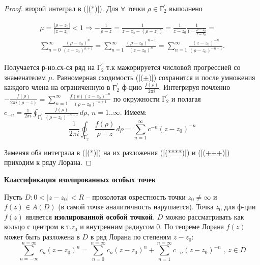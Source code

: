 \begin{proof}
\bigbreak
{} второй интеграл в (\ref{(*)}). Для $\forall$ точки $\rho \in  \text{Г}_2^{'}$ выполнено 

\begin{equation}
\begin{gathered}
    \mu=\frac{|\rho-z_0|}{|z-z_0|}<1 \Rightarrow -\frac{1}{\rho-z} = \frac{1}{z-z_0-(\rho-z_0)} = \frac{1}{z-z_0}\frac{1}{1-\frac{\rho-z_0}{z-z_0}}=
        \\
    \sum_{n=0}^{\infty}\frac{(\rho-z_0)^n}{(z-z_0)^{n+1}}=\sum_{n=1}^{\infty}\frac{(\rho-z_0)^{n-1}}{(z-z_0)^{n}}=
    \sum_{n=1}^{\infty}\frac{(z-z_0)^{-n} }{(\rho-z_0)^{-n+1}}.
\end{gathered}
    \label{(+)}
\end{equation}

Получается р-но.сх-ся ряд на $\text{Г}_2^{'}$ т.к мажорируется числовой прогрессией со знаменателем $\mu$. Равномерная сходимость (\ref{(+)}) сохранится и после умножения каждого члена на ограниченную в $\text{Г}_2^{'}$ ф-цию $\frac{f(\rho)}{2\pi i}$. Интегрируя почленно $-\frac{f(\rho)}{2\pi i(\rho-z)}=\sum_{n=1}^{\infty}\frac{f(\rho)(z-z_0)^{-n} }{(\rho-z_0)^{-n+1}}$ по окружности $\text{Г}_2^{'}$ и полагая $c_{-n} = \frac{1}{2\pi i} \oint_{ \text{Г}_1^{'}} \frac{f(\rho)}{(\rho-z_0)^{-n+1}} \,d\rho \text{, }n=1..\infty$. Имеем: 
\begin{equation}
    \frac{1}{2\pi i} \oint_{ \text{Г}_2^{'}} \frac{f(\rho)}{\rho-z} \,d\rho = \sum_{n=1}^{\infty} c^{-n}(z-z_0)^{-n}
    \label{(+++)}
\end{equation}


Заменяя оба интеграла в (\ref{(*)}) на их разложения (\ref{(****)}) и (\ref{(+++)}) приходим к ряду Лорана.
\end{proof}

\textbf{Классификация изолированных особых точек}

Пусть $D:0<|z-z_0|<R$ -- проколотая окрестность точки $z_0\neq\infty$ и $f(z) \in A(D)$ (в самой точке аналитичность нарушается). Точка $z_0$ для ф-ции $f(z)$ является \textbf{изолированной особой точкой}. $D$ можно рассматривать как кольцо с центром в т.$z_0$ и внутренним радиусом 0. По теореме Лорана $f(z)$ может быть разложена в $D$ в ряд Лорана по степеням $z-z_0$: 
$$\sum_{n=-\infty}^{n=\infty}c_n(z-z_0)^n=\sum_{n=0}^{n=\infty}c_n(z-z_0)^n +\sum_{n=1}^{n=\infty}c_{-n}(z-z_0)^{-n} \text{ , } z \in D$$

